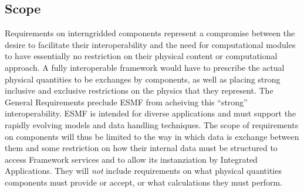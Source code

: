\subsection{Scope}



Requirements on interngridded components represent a compromise between
the desire to facilitate their interoperability and the need for
computational modules to have essentially no restriction on their
physical content or computational approach.
A fully interoperable framework would
have to prescribe the actual physical quantities to be exchanges
by components, as well as placing strong inclusive and exclusive 
restrictions on the physics that they represent. The General Requirements
 preclude ESMF from acheiving this  ``strong'' interoperability.
ESMF is intended for  diverse
applications and must support  the rapidly  evolving 
models and data handling techniques.
The scope of requirements on components will thus be limited to the
way in which data is exchange between them and some restriction
on how their internal data must be structured to access Framework
services and to allow its instanziation by Integrated Applications.
They will {\em not} include requirements on what physical quantities
components must provide or accept, or what calculations they
must perform.

















